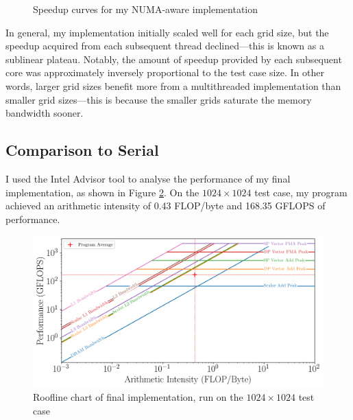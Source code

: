 \documentclass[twocolumn, a4paper]{article}
\begin{document}
\begin{figure}[htpb]
{
  }
  \caption{Speedup curves for my NUMA-aware implementation}\label{fig:scaling}
\end{figure}

In general, my implementation initially scaled well for each grid size, but the speedup acquired from each subsequent thread declined---this is known as a sublinear plateau.
Notably, the amount of speedup provided by each subsequent core was approximately inversely proportional to the test case size.
In other words, larger grid sizes benefit more from a multithreaded implementation than smaller grid sizes---this is because the smaller grids saturate the memory bandwidth sooner.

\subsection{Comparison to Serial}

I used the Intel Advisor tool to analyse the performance of my final implementation, as shown in Figure \ref{fig:roofline_numa}.
On the $1024\times1024$ test case, my program achieved an arithmetic intensity of 0.43 FLOP/byte and 168.35 GFLOPS of performance.

\begin{figure}[htbp]
  \includegraphics[width=\linewidth]{roofline_numa.png}
  \caption{Roofline chart of final implementation, run on the $1024\times1024$ test case}\label{fig:roofline_numa}
\end{figure}
\end{document}
